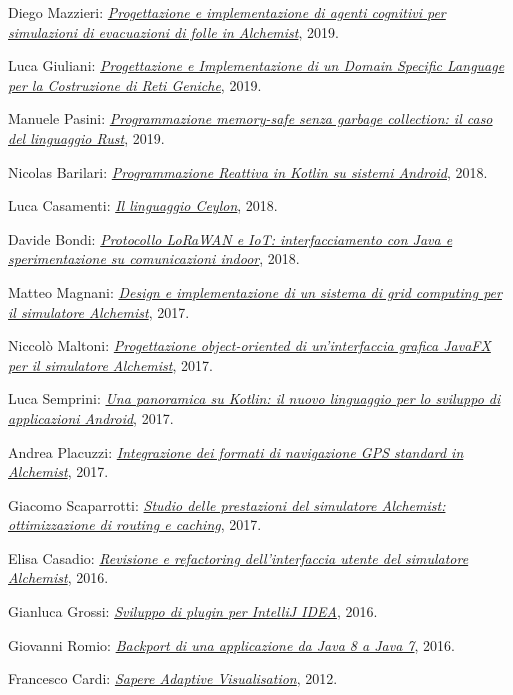 \begin{innerlist}
    \item Diego Mazzieri: \href{https://amslaurea.unibo.it/19084/}{\textit{Progettazione e implementazione di agenti cognitivi per simulazioni di evacuazioni di folle in Alchemist}}, 2019.
    \item Luca Giuliani: \href{https://amslaurea.unibo.it/19071/}{\textit{Progettazione e Implementazione di un Domain Specific Language per la Costruzione di Reti Geniche}}, 2019.
    \item Manuele Pasini: \href{http://amslaurea.unibo.it/18535/}{\textit{Programmazione memory-safe senza garbage collection: il caso del linguaggio Rust}}, 2019.
    \item Nicolas Barilari: \href{http://amslaurea.unibo.it/16841/}{\textit{Programmazione Reattiva in Kotlin su sistemi Android}}, 2018.
    \item Luca Casamenti: \href{http://amslaurea.unibo.it/16788/}{\textit{Il linguaggio Ceylon}}, 2018.
    \item Davide Bondi: \href{http://amslaurea.unibo.it/15730/}{\textit{Protocollo LoRaWAN e IoT: interfacciamento con Java e sperimentazione su comunicazioni indoor}}, 2018.
    \item Matteo Magnani: \href{http://amslaurea.unibo.it/17133/}{\textit{Design e implementazione di un sistema di grid computing per il simulatore Alchemist}}, 2017.
    \item Niccolò Maltoni: \href{http://amslaurea.unibo.it/14682/}{\textit{Progettazione object-oriented di un'interfaccia grafica JavaFX per il simulatore Alchemist}}, 2017.
    \item Luca Semprini: \href{http://amslaurea.unibo.it/14673/}{\textit{Una panoramica su Kotlin: il nuovo linguaggio per lo sviluppo di applicazioni Android}}, 2017.
    \item Andrea Placuzzi: \href{http://amslaurea.unibo.it/14329/}{\textit{Integrazione dei formati di navigazione GPS standard in Alchemist}}, 2017.
    \item Giacomo Scaparrotti: \href{http://amslaurea.unibo.it/14019/}{\textit{Studio delle prestazioni del simulatore Alchemist: ottimizzazione di routing e caching}}, 2017.
    \item Elisa Casadio: \href{http://amslaurea.unibo.it/12310/}{\textit{Revisione e refactoring dell'interfaccia utente del simulatore Alchemist}}, 2016.
    \item Gianluca Grossi: \href{http://amslaurea.unibo.it/12503/}{\textit{Sviluppo di plugin per IntelliJ IDEA}}, 2016.
    \item Giovanni Romio: \href{http://amslaurea.unibo.it/10481/}{\textit{Backport di una applicazione da Java 8 a Java 7}}, 2016.
    \item Francesco Cardi: \href{http://archive.fo/zMGo8}{\textit{Sapere Adaptive Visualisation}}, 2012.
\end{innerlist}

